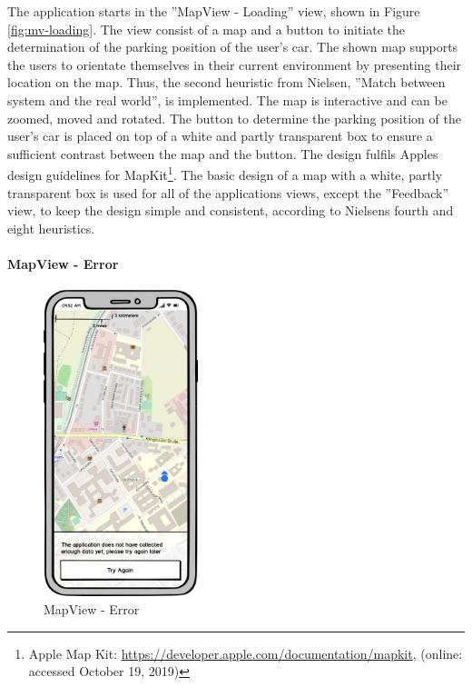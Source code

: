 The application starts in the ''MapView - Loading'' view, shown in Figure \ref{fig:mv-loading}. The view consist of a map and a button to initiate the determination of the parking position of the user's car. The shown map supports the users to orientate themselves in their current environment by presenting their location on the map. Thus, the second heuristic from Nielsen, ''Match between system and the real world'', is implemented. The map is interactive and can be zoomed, moved and rotated. The button to determine the parking position of the user's car is placed on top of a white and partly transparent box to ensure a sufficient contrast between the map and the button. The design fulfils Apples design guidelines for MapKit\footnote{Apple Map Kit: \url{https://developer.apple.com/documentation/mapkit}, (online: accessed October 19, 2019) }. The basic design of a map with a white, partly transparent box is used for all of the applications views, except the ''Feedback'' view, to keep the design simple and consistent, according to Nielsens fourth and eight heuristics. \cite{nielsen1994usability} \cite{apple:interfaceguidliines}


\paragraph{MapView - Error}

\begin{figure}[h]
    \centering
    \includegraphics[width=0.4\textwidth]{images/UI/Iteration4-MapView-Error.png}
    \caption{MapView - Error}
    \label{fig:mv-error}
\end{figure}

